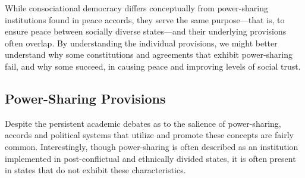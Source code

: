 \documentclass[12pt]{article}
\begin{document}
While consociational democracy differs conceptually from power-sharing institutions found in peace accords, they serve the same purpose—that is, to ensure peace between socially diverse states—and their underlying provisions often overlap. By understanding the individual provisions, we might better understand why some constitutions and agreements that exhibit power-sharing fail, and why some succeed, in causing peace and improving levels of social trust. 

\subsection{Power-Sharing Provisions}
Despite the persistent academic debates as to the salience of power-sharing, accords and political systems that utilize and promote these concepts are fairly common. Interestingly, though power-sharing is often described as an institution implemented in post-conflictual and ethnically divided states, it is often present in states that do not exhibit these characteristics. 
\end{document}
